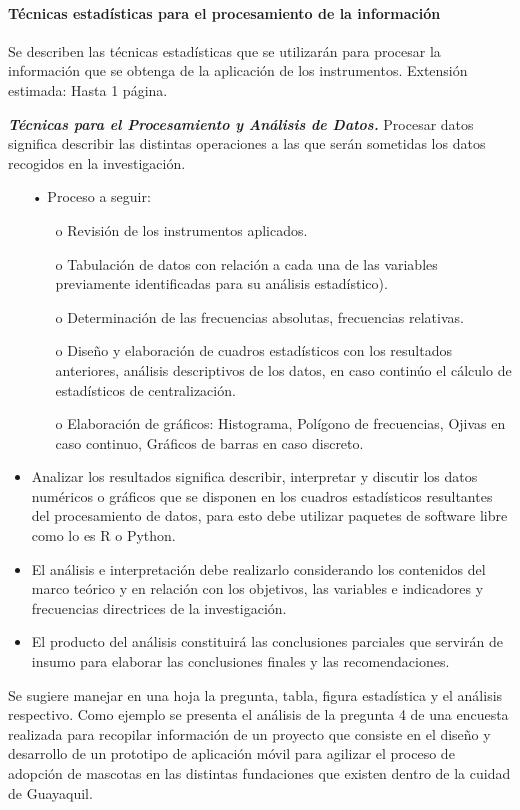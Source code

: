\documentclass[12pt, a4paper, nofontenc, numbers=endperiod]{apa7}
\begin{document}
{{\begin{itemize}[leftmargin=2.90cm]
\begin{itemize}[leftmargin=0.5cm]
	\end{itemize}

\end{itemize}
}
\setlength{\parindent}{1.27cm}\paragraph{Técnicas estadísticas para el procesamiento de la información}Se describen las técnicas estadísticas que se utilizarán para procesar la información que se obtenga de la aplicación de los instrumentos. Extensión estimada: Hasta 1 página.

\setlength{\parindent}{1.27cm}\textbf{\textit{Técnicas para el Procesamiento y Análisis de Datos. }} Procesar datos significa describir las distintas operaciones a las que serán sometidas los datos recogidos en la investigación.

{\doublespacing
\begin{itemize}[leftmargin=2.90cm]
	\item[•] Proceso a seguir: 
	\begin{itemize}[leftmargin=0.5cm]
		\item[o] Revisión de los instrumentos aplicados.
		\item[o] Tabulación de datos con relación a cada una de las variables previamente identificadas para su análisis estadístico).
		\item[o] Determinación de las frecuencias absolutas, frecuencias relativas.
		\item[o] Diseño y elaboración de cuadros estadísticos con los resultados anteriores, análisis descriptivos de los datos, en caso continúo el cálculo de estadísticos de centralización.
		\item[o]	Elaboración de gráficos: Histograma, Polígono de frecuencias, Ojivas en caso continuo, Gráficos de barras en caso discreto.
	\end{itemize}
	\item Analizar los resultados significa describir, interpretar y discutir los datos numéricos o gráficos que se disponen en los cuadros estadísticos resultantes del procesamiento de datos, para esto debe utilizar paquetes de software libre como lo es R o Python.
	\item El análisis e interpretación debe realizarlo considerando los contenidos del marco teórico y en relación con los objetivos, las variables e indicadores y frecuencias directrices de la investigación.
	\item El producto del análisis constituirá las conclusiones parciales que servirán de insumo para elaborar las conclusiones finales y las recomendaciones.
\end{itemize}
}
\setlength{\parindent}{1.27cm}Se sugiere manejar en una hoja la pregunta, tabla, figura estadística y el análisis respectivo. Como ejemplo se presenta el análisis de la pregunta 4 de una encuesta realizada para recopilar información de un proyecto que consiste en el diseño y desarrollo de un prototipo de aplicación móvil para agilizar el proceso de adopción de mascotas en las distintas fundaciones que existen dentro de la cuidad de Guayaquil. 

}
\end{document}
